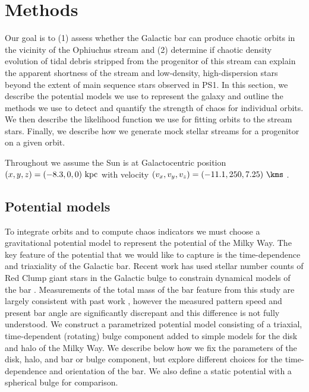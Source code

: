 \documentclass[numberedappendix]{emulateapj}
\begin{document}
\section{Methods}\label{sec:method}

Our goal is to (1) assess whether the Galactic bar can produce chaotic orbits in the vicinity of the Ophiuchus stream and (2) determine if chaotic density evolution of tidal debris stripped from the progenitor of this stream can explain the apparent shortness of the stream and low-density, high-dispersion stars beyond the extent of main sequence stars observed in PS1. In this section, we describe the potential models we use to represent the galaxy and outline the methods we use to detect and quantify the strength of chaos for individual orbits. We then describe the likelihood function we use for fitting orbits to the stream stars. Finally, we describe how we generate mock stellar streams for a progenitor on a given orbit. 

Throughout we assume the Sun is at Galactocentric position $(x,y,z) = (-8.3,0,0)~{\rm kpc}$ \citep[e.g.,][]{schoenrich12} with velocity $(v_x,v_y,v_z) = (-11.1, 250, 7.25)~\kms$ \citep[e.g.,][]{schoenrich10, schoenrich12}.

\subsection{Potential models}\label{sec:potential}

To integrate orbits and to compute chaos indicators we must choose a gravitational potential model to represent the potential of the Milky Way. The key feature of the potential that we would like to capture is the time-dependence and triaxiality of the Galactic bar. Recent work has used stellar number counts of Red Clump giant stars in the Galactic bulge to constrain dynamical models of the bar \citep{portail15}. Measurements of the total mass of the bar feature from this study are largely consistent with past work \citep[e.g.,][]{wang12}, however the measured pattern speed and present bar angle are significantly discrepant and this difference is not fully understood. We construct a parametrized potential model consisting of a triaxial, time-dependent (rotating) bulge component added to simple models for the disk and halo of the Milky Way. We describe below how we fix the parameters of the disk, halo, and bar or bulge component, but explore different choices for the time-dependence and orientation of the bar. We also define a static potential with a spherical bulge for comparison. 
\end{document}
